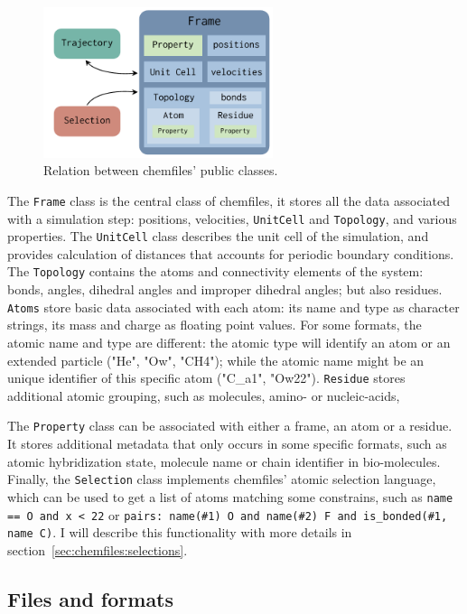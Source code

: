 \documentclass[thesis]{subfiles}
\begin{document}
\begin{figure}[ht]
    \centering
    \includegraphics[width=0.6\textwidth]{figures/images/chemfiles-classes}
    \caption{Relation between chemfiles' public classes.}
    \label{fig:chemfiles:classes}
\end{figure}

The \texttt{Frame} class is the central class of chemfiles, it stores all the
data associated with a simulation step: positions, velocities, \texttt{UnitCell}
and \texttt{Topology}, and various properties. The \texttt{UnitCell} class
describes the unit cell of the simulation, and provides calculation of distances
that accounts for periodic boundary conditions. The \texttt{Topology} contains
the atoms and connectivity elements of the system: bonds, angles, dihedral
angles and improper dihedral angles; but also residues. \texttt{Atoms} store
basic data associated with each atom: its name and type as character strings,
its mass and charge as floating point values. For some formats, the atomic name
and type are different: the atomic type will identify an atom or an extended
particle ("He", "Ow", "CH4"); while the atomic name might be an unique
identifier of this specific atom ("C\_a1", "Ow22"). \texttt{Residue} stores
additional atomic grouping, such as molecules, amino- or nucleic-acids, \etc

The \texttt{Property} class can be associated with either a frame, an atom or a
residue. It stores additional metadata that only occurs in some specific
formats, such as atomic hybridization state, molecule name or chain identifier
in bio-molecules. Finally, the \texttt{Selection} class implements chemfiles'
atomic selection language, which can be used to get a list of atoms matching
some constrains, such as \texttt{name == O and x < 22} or \texttt{pairs:
name(\#1) O and name(\#2) F and is\_bonded(\#1, name C)}. I will describe this
functionality with more details in section~\ref{sec:chemfiles:selections}.

\subsection{Files and formats}
\label{sec:chemfiles:formats}
\end{document}
